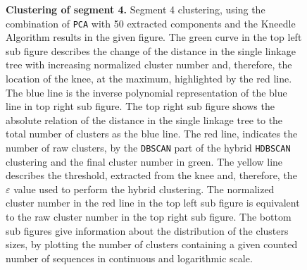 \begin{figure}[!hbt]
\begin{subfigure}[b]{0.475\textwidth}
    \end{subfigure}
    \caption[Clustering of segment 4]{\textbf{Clustering of segment 4.} Segment 4 clustering, using the combination of \texttt{PCA} with 50 extracted components and the Kneedle Algorithm results in the given figure. The green curve in the top left sub figure describes the change of the distance in the single linkage tree with increasing normalized cluster number and, therefore, the location of the knee, at the maximum, highlighted by the red line. The blue line is the inverse polynomial representation of the blue line in top right sub figure. The top right sub figure shows the absolute relation of the distance in the single linkage tree to the total number of clusters as the blue line. The red line, indicates the number of raw clusters, by the \texttt{DBSCAN} part of the hybrid \texttt{HDBSCAN} clustering and the final cluster number in green. The yellow line describes the threshold, extracted from the knee and, therefore, the $\varepsilon$ value used to perform the hybrid clustering. The normalized cluster number in the red line in the top left sub figure is equivalent to the raw cluster number in the top right sub figure. The bottom sub figures give information about the distribution of the clusters sizes, by plotting the number of clusters containing a given counted number of sequences in continuous and logarithmic scale.}
    \label{fig:Result_Cluster_Knee_4}
\end{figure}



